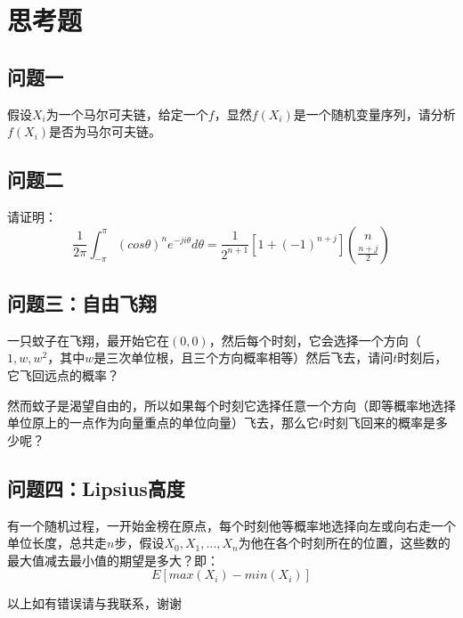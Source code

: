 \section{思考题}
	\subsection{问题一}
		假设$X_i$为一个马尔可夫链，给定一个$f$，显然$f(X_i)$是一个随机变量序列，请分析$f(X_i)$是否为马尔可夫链。

	\subsection{问题二}
		请证明：
		$$
		\frac{1}{2\pi}\int_{-\pi}^{\pi}(cos\theta)^ne^{-ji\theta}d\theta = \frac{1}{2^{n+1}}[1+(-1)^{n+j}]\binom{n}{\frac{n+j}{2}}
		$$
	\subsection{问题三：自由飞翔}
		一只蚊子在飞翔，最开始它在$(0,0)$，然后每个时刻，它会选择一个方向（$1,w,w^2$，其中$w$是三次单位根，且三个方向概率相等）然后飞去，请问$t$时刻后，它飞回远点的概率？
		
		然而蚊子是渴望自由的，所以如果每个时刻它选择任意一个方向（即等概率地选择单位原上的一点作为向量重点的单位向量）飞去，那么它$t$时刻飞回来的概率是多少呢？
		
	\subsection{问题四：Lipsius高度}
		有一个随机过程，一开始金榜在原点，每个时刻他等概率地选择向左或向右走一个单位长度，总共走$n$步，假设$X_0, X_1, \dots, X_n$为他在各个时刻所在的位置，这些数的最大值减去最小值的期望是多大？即：
		$$
			E[max(X_i) - min(X_i)]
		$$
	
	\vspace{2cm}
	以上如有错误请与我联系，谢谢
　
